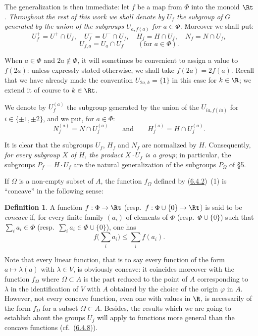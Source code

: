\documentclass[12pt,a4paper,oneside,english]{smfart}
\makeatletter
\newcommand{\btanchor}[1]{\leavevmode\Hy@raisedlink{\hypertarget{bt:#1}{}}}
\newcommand{\btpageanchor}[1]{\Hy@raisedlink{\hypertarget{p:#1}{}}}
\newcommand{\btref}[1]{\hyperlink{bt:#1}{#1}}
\newcommand{\btpage}[1]{\marginnote{p.~#1}\btpageanchor{#1}}
\newcommand{\pmark}[1]{\btpage{#1}}
\theoremstyle{definition}
\theoremstyle{bt}
\newtheorem{defn}{Definition}
\makeatother
\begin{document}
The generalization is then immediate: let $f$ be a map from $\Phi$ into the
monoid $\Rt$.
\pmark{133}
\emph{Throughout the rest of this work we shall denote by $U_f$ the subgroup
of $G$ generated by the union of the subgroups $U_{a,f(a)}$ for $a\in\Phi$.}
Moreover we shall put:
\[
  U_f^{+}=U^{+}\cap U_f,\quad U_f^{-}=U^{-}\cap U_f,\quad   H_f=H\cap U_f,\quad N_f=N\cap U_f,
\]
\[
  U_{f,a}=U_a\cap U_f\qquad(\text{for }a\in\Phi).
\]

When $a\in\Phi$ and $2a\notin\Phi$, it will sometimes be convenient to
assign a value to $f(2a)$: unless expressly stated otherwise, we shall take
$f(2a)=2f(a)$. Recall that we have already made the convention
$U_{2a,k}=\{1\}$ in this case for $k\in\R$; we extend it of course to
$k\in\Rt$.

We denote by $U_f^{(a)}$ the subgroup generated by the union of the
$U_{ia,f(ia)}$ for $i\in\{\pm1,\pm2\}$, and we put, for $a\in\Phi$:
\[
  N_f^{(a)}=N\cap U_f^{(a)}\qquad\text{and}\qquad H_f^{(a)}=H\cap U_f^{(a)}.
\]

It is clear that the subgroups $U_f$, $H_f$ and $N_f$ are normalized by
$H$. Consequently, \emph{for every subgroup $X$ of $H$, the product
$X\cdot U_f$ is a group}; in particular, the subgroups $P_f=H\cdot U_f$ are
the natural generalization of the subgroups $P_{\Omega}$ of \S5.

\btanchor{6.4.3}
If $\Omega$ is a non-empty subset of $A$, the function $f_{\Omega}$ defined
by (\btref{6.4.2})~(1) is ``concave'' in the following sense:

\begin{defn}
A function $f:\Phi\to\Rt$ (resp.\ $f:\Phi\cup\{0\}\to\Rt$) is said to be
\emph{concave} if, for every finite family $(a_i)$ of elements of $\Phi$
(resp.\ $\Phi\cup\{0\}$) such that $\sum_i a_i\in\Phi$ (resp.\
$\sum_i a_i\in\Phi\cup\{0\}$), one has
\begin{equation*}\tag{C}
  f\Big(\sum_i a_i\Big)\leq\sum_i f(a_i).
\end{equation*}
\end{defn}

\btanchor{6.4.4}
Note that every linear function, that is to say every function of the form
$a\mapsto\lambda(a)$ with $\lambda\in V$, is obviously concave: it coincides
moreover with the function $f_{\Omega}$ where $\Omega\subset A$ is the part
reduced to the point of $A$ corresponding to $\lambda$ in the
identification of $V$ with $A$ obtained by the choice of the origin
$\varphi$ in $A$. However, not every concave function, even one with values
in $\R$, is necessarily of the form $f_{\Omega}$ for a subset
$\Omega\subset A$. Besides, the results which we are going to establish
about the groups $U_f$ will apply to functions more general than the
concave functions (cf.\ (\btref{6.4.8})).
\end{document}
